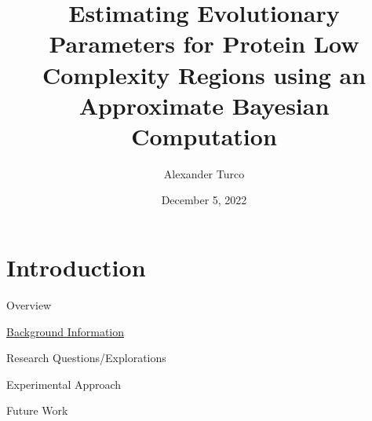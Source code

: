 \documentclass{beamer}
\title[BEAP Dec 2022]{Estimating Evolutionary Parameters for Protein Low Complexity Regions using an Approximate Bayesian Computation}
\author{Alexander Turco}
\date{December 5, 2022}
\begin{document}
	
	\section{Introduction}
	\begin{frame}
		\titlepage 
	\end{frame}
	
	\logo{}
	
	\begin{frame}{Overview}
		
		\begin{center}
		\begin{minipage}{6cm}
				
		  		\begin{block}{} \hyperlink{link1}{Background Information} \end{block}
		  		\begin{block}{} Research Questions/Explorations \end{block}
		  		\begin{block}{} Experimental Approach \end{block}
		  		\begin{block}{} Future Work \end{block}

		\end{minipage}
		\end{center}
	
	\end{frame}
	
\end{document}

